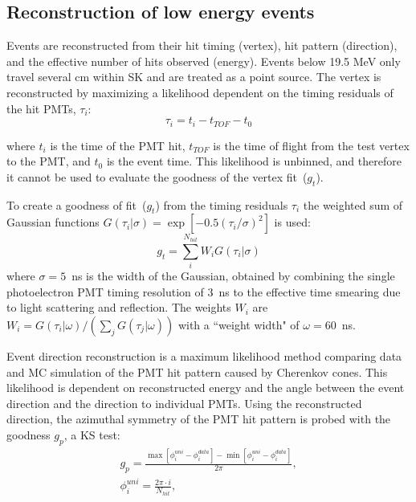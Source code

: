 \subsection{Reconstruction of low energy events}
\label{sec:lowereco}
Events are reconstructed from their hit timing (vertex), hit pattern (direction), and the effective number of hits observed (energy). Events below 19.5 MeV only travel several cm within SK and are treated as a point source. The vertex is reconstructed by maximizing a likelihood dependent on the timing residuals of the hit PMTs, $\tau_i$:
\begin{equation}
    \tau_i = t_i - t_{TOF} - t_0
\label{eq:timeres}
\end{equation}

where $t_i$ is the time of the PMT hit, $t_{TOF}$ is the time of flight from the test vertex to the PMT, and $t_0$ is the event time. This likelihood is unbinned, and therefore it cannot be used to evaluate the goodness of the vertex fit~($g_t$). 

To create a goodness of fit~($g_t$) from the timing residuals $\tau_i$ the weighted sum of Gaussian functions $G(\tau_i|\sigma)=\exp\left[-0.5\left(\tau_i/\sigma\right)^2\right]$ is used:
\begin{equation}
    g_t=\sum_i^{N_{hit}}W_i G(\tau_i|\sigma)
\label{eq:gvt}
\end{equation}
where $\sigma=5$~ns is the width of the Gaussian, obtained by combining the single photoelectron PMT timing resolution of 3~ns to the effective time smearing due to light scattering and reflection. The weights $W_i$ are $W_i=G(\tau_i|\omega)/(\sum_j G(\tau_j|\omega))$
with a ``weight width" of $\omega=60$~ns.

Event direction reconstruction is a maximum likelihood method comparing data and MC simulation of the PMT hit pattern caused by Cherenkov cones. This likelihood is dependent on reconstructed energy and the angle between the event direction and the direction to individual PMTs. Using the reconstructed direction, the azimuthal symmetry of the PMT hit pattern is probed with the goodness $g_p$, a KS test:
\begin{equation}
\begin{gathered}
g_p = \frac{\max[\phi^{uni}_i-\phi^{data}_i] - \min[\phi^{uni}_i-\phi^{data}_i]}{2\pi}, \\
\phi^{uni}_i = \frac{2\pi\cdot i}{N_{hit}},
\end{gathered}
\label{eq:gdir}
\end{equation}

